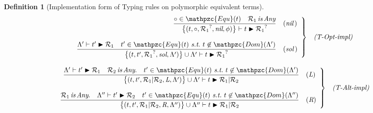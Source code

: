 \documentclass[12pt]{article}
\newtheorem{Definition}{Definition}[section]
\begin{document}
\begin{Definition}[Implementation form of Typing rules on
    polymorphic equivalent terms]
\begin{displaymath}
\begin{array}{c}
      \begin{array}{rl}
        \left. \begin{array}{rl}
          \dfrac{
            \circ \in \mathpzc{Equ}(t)
             \quad \mathcal{R}_1 \,\text{\it is}\, \text{\it Any}
          }{
            \bigl\{(t, \circ, {\mathcal{R}_1}^?, \text{\it nil}, \phi)
             \bigr\} \vdash t \blacktriangleright {\mathcal{R}_1}^?
          }  &  (\text{\it nil}\,)  \\
          \\
          
          \dfrac{
            \Lambda' \vdash t' \blacktriangleright \mathcal{R}_1 \quad
             t' \in \mathpzc{Equ}(t)\ \text{\it s.t.}\
              t \not\in \mathpzc{Dom}(\Lambda')
          }{
            \bigl\{(t, t', {\mathcal{R}_1}^?, \text{\it sol},
             \Lambda') \bigr\} \cup \Lambda' \vdash
              t \blacktriangleright {\mathcal{R}_1}^?
          }  &  (\text{\it sol}\,)
        \end{array} \right\}  &  \text{\it (T-Opt-impl)}
      \end{array}  \\
      \\
      
      \begin{array}{rl}
        \left. \begin{array}{rl}
          \dfrac{
            \Lambda' \vdash t' \blacktriangleright \mathcal{R}_1 \quad
             \mathcal{R}_2 \,\text{\it is}\, \text{\it Any}. \quad
              t' \in \mathpzc{Equ}(t)\ \text{\it s.t.}\
               t \not\in \mathpzc{Dom}(\Lambda')
          }{
            \bigl\{(t, t', \mathcal{R}_1|\mathcal{R}_2,
             \text{\it L}, \Lambda') \bigr\} \cup \Lambda' \vdash
              t \blacktriangleright \mathcal{R}_1|\mathcal{R}_2
          }  &  (\text{\it L})  \\
          \\
          
          \dfrac{
            \mathcal{R}_1 \,\text{\it is}\, \text{\it Any}. \quad
             \Lambda'' \vdash t' \blacktriangleright \mathcal{R}_2 \quad
              t' \in \mathpzc{Equ}(t)\ \text{\it s.t.}\
               t \not\in \mathpzc{Dom}(\Lambda'')
          }{
            \bigl\{(t, t', \mathcal{R}_1|\mathcal{R}_2,
             \text{\it R}, \Lambda'') \bigr\} \cup \Lambda'' \vdash
              t \blacktriangleright \mathcal{R}_1|\mathcal{R}_2
          }  &  (\text{\it R})
        \end{array} \right\}  &  \text{\it (T-Alt-impl)}
      \end{array}
      
    \end{array}
  \end{displaymath}
\end{Definition}
\end{document}
